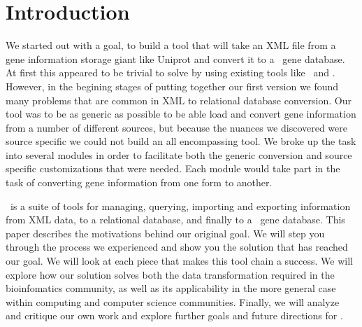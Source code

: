 \section{Introduction}
We started out with a goal, to build a tool that will take an XML file from a gene information storage giant like Uniprot and convert it to a \genmapp~gene database. At first this appeared to be trivial to solve by using existing tools like ~and \hibernate. However, in the begining stages of putting together our first version we found many problems that are common in XML to relational database conversion. Our tool was to be as generic as possible to be able load and convert gene information from a number of different sources, but because the nuances we discovered were source specific we could not build an all encompassing tool. We broke up the task into several modules in order to facilitate both the generic conversion and source specific customizations that were needed.  Each module would take part in the task of converting gene information from one form to another.

\xmlpipedb~is a suite of tools for managing, querying, importing and exporting information from XML data, to a relational database, and finally to a \genmapp~gene database. This paper describes the motivations behind our original goal.  We will step you through the process we experienced and show you the solution that has reached our goal. We will look at each piece that makes this tool chain a success.  We will explore how our solution solves both the data transformation required in the bioinfomatics community, as well as its applicability in the more general case within computing and computer science communities.  Finally, we will analyze and critique our own work and explore further goals and future directions for \xmlpipedb.
